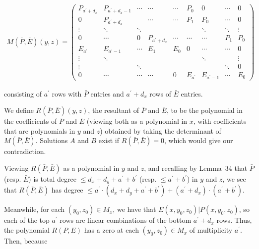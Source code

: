 \documentclass[10pt,a4paper]{article}
\begin{document}
\[\begin{gathered}
M(\bar{P},\bar{E})(y,z)=\begin{pmatrix}P_{a^{\prime}+d_{x}}&P_{a^{\prime}+d_{x}-1}&\cdots&\cdots&\cdots&P_{0}&0&\cdots&0\\
0&P_{a^{\prime}+d_{x}}&&\cdots&\cdots&P_{1}&P_{0}&\cdots&0\\
\vdots&\ddots&\ddots&&&&\ddots&\ddots&\vdots\\
0&\cdots&0&P_{a^{\prime}+d_{x}}&\cdots&\cdots&\cdots&P_{1}&P_{0}\\
E_{a^{\prime}}&E_{a^{\prime}-1}&\cdots&E_{1}&E_{0}&0&\cdots&\cdots&0\\
\vdots&\ddots&&&&&\ddots&&\vdots\\
\vdots&&\ddots&&&&&\ddots&0\\
0&\cdots&\cdots&\cdots&0&E_{a^{\prime}}&E_{a^{\prime}-1}&\cdots&E_{0}\end{pmatrix}
\end{gathered}\]


consisting of $a^{\prime}$ rows with $\bar{P}$ entries and $a^{\prime}+d_{x}$ rows of $\bar{E}$ entries.\par




We define $R(\bar{P},\bar{E})(y,z)$, the resultant of $\bar{P}$ and $\bar{E}$, to be the polynomial in the coefficients of $\bar{P}$ and $\bar{E}$ (viewing both as a polynomial in $x$, with coefficients that are polynomials in $y$ and $z$) obtained by taking the determinant of $M(\bar{P},\bar{E})$. Solutions $A$ and $B$ exist if $R(\bar{P},\bar{E})=0$, which would give our contradiction.\par




Viewing $R(\bar{P},\bar{E})$ as a polynomial in $y$ and $z$, and recalling by Lemma 34 that $\bar{P}$ (resp. $\bar{E}$) is total degree $\leq d_{x}+d_{y}+a^{\prime}+b^{\prime}$ (resp. $\leq a^{\prime}+b^{\prime}$) in $y$ and $z$, we see that $R(\bar{P},\bar{E})$ has degree $\leq a^{\prime}\cdot(d_{x}+d_{y}+a^{\prime}+b^{\prime})+(a^{\prime}+d_{x})\cdot(a^{\prime}+b^{\prime})$.\par




Meanwhile, for each $(y_{0},z_{0})\in M_{x}$, we have that $E(x,y_{0},z_{0})|P(x,y_{0},z_{0})$, so each of the top $a^{\prime}$ rows are linear combinations of the bottom $a^{\prime}+d_{x}$ rows. Thus, the polynomial $R(P,E)$ has a zero at each $(y_{0},z_{0})\in M_{x}$ of multiplicity $a^{\prime}$. Then, because\par
\end{document}
